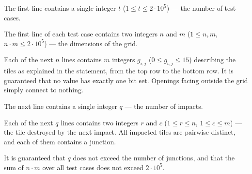 The first line contains a single integer $t$ ($1 \le t \le 2 \cdot 10^5$) --- the number of test cases.

The first line of each test case contains two integers $n$ and $m$ ($1 \le n, m$, $n \cdot m \le 2 \cdot 10^5$) --- the dimensions of the grid.

Each of the next $n$ lines contains $m$ integers $g_{i,j}$ ($0 \le g_{i,j} \le 15$) describing the tiles as explained in the statement, from the top row to the bottom row. It is guaranteed that no value has exactly one bit set. Openings facing outside the grid simply connect to nothing.

The next line contains a single integer $q$ --- the number of impacts.

Each of the next $q$ lines contains two integers $r$ and $c$ ($1 \le r \le n$, $1 \le c \le m$) --- the tile destroyed by the next impact. All impacted tiles are pairwise distinct, and each of them contains a junction.

It is guaranteed that $q$ does not exceed the number of junctions, and that the sum of $n \cdot m$ over all test cases does not exceed $2 \cdot 10^5$.
